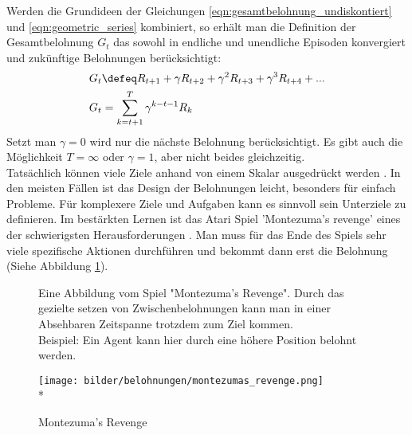 \documentclass[a4paper,titlepage]{article}
\numberwithin{equation}{section} %
\begin{document}

Werden die Grundideen der Gleichungen \ref{eqn:gesamtbelohnung_undiskontiert} und \ref{eqn:geometric_series} kombiniert, so erhält man die Definition der Gesamtbelohnung $G_t$ das sowohl in endliche und unendliche Episoden konvergiert und zukünftige Belohnungen berücksichtigt:
\begin{align}
G_t &\defeq R_{t+1} + \gamma R_{t+2} + \gamma^{2}R_{t+3} + \gamma^{3}R_{t+4} + ... \nonumber \\*
G_t &= \sum_{k=t+1}^{T} \gamma^{k-t-1}R_k
\end{align}
\newpage
Setzt man $\gamma=0$ wird nur die nächste Belohnung berücksichtigt. Es gibt auch die Möglichkeit $T=\infty$ oder $ \gamma=1$, aber nicht beides gleichzeitig. \\
Tatsächlich können viele Ziele anhand von einem Skalar ausgedrückt werden \cite{Sutton}. In den meisten Fällen ist das Design der Belohnungen leicht, besonders für einfach Probleme. Für komplexere Ziele und Aufgaben kann es sinnvoll sein Unterziele zu definieren. Im bestärkten Lernen ist das Atari Spiel 'Montezuma's revenge' eines der schwierigsten Herausforderungen \cite{montezuma}. Man muss für das Ende des Spiels sehr viele spezifische Aktionen durchführen und bekommt dann erst die Belohnung (Siehe Abbildung \ref{fig:montezuma}).

\begin{figure}
	\hspace{0.05\textwidth}
	\begin{minipage}{0.5\textwidth}
	\caption{Montezuma's Revenge}
	\label{fig:montezuma}
	Eine Abbildung vom Spiel "Montezuma's Revenge". Durch das gezielte setzen von Zwischenbelohnungen kann man in einer Absehbaren Zeitspanne trotzdem zum Ziel kommen. \\Beispiel: Ein Agent kann hier durch eine höhere Position belohnt werden.
\end{minipage}
\hspace{1.5mm}
\begin{minipage}{0.3\textwidth}
	\texttt{[image: bilder/belohnungen/montezumas\_revenge.png]} \\*
\end{minipage}\hspace{0.1\textwidth}
\end{figure}
\end{document}
